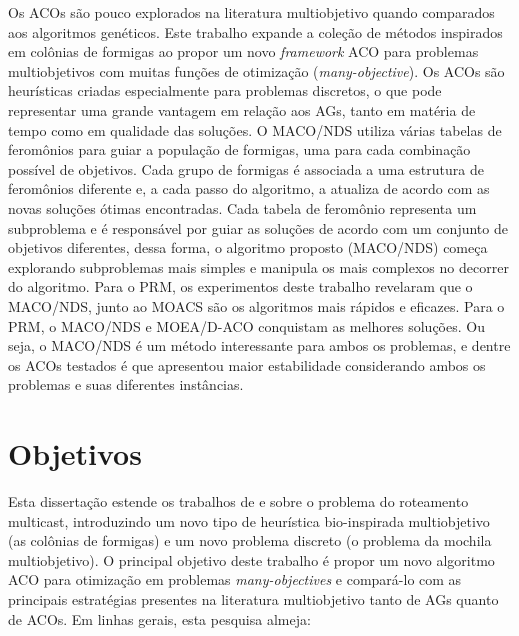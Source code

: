 Os \acp{ACO} são pouco explorados na literatura multiobjetivo quando comparados aos algoritmos genéticos. Este trabalho expande a coleção de métodos inspirados em colônias de formigas ao propor um novo \textit{framework} ACO para problemas multiobjetivos com muitas funções de otimização (\textit{many-objective}). Os ACOs são heurísticas criadas especialmente para problemas discretos, o que pode representar uma grande vantagem em relação aos AGs, tanto em matéria de tempo como em qualidade das soluções. O MACO/NDS utiliza várias tabelas de feromônios para guiar a população de formigas, uma para cada combinação possível de objetivos. Cada grupo de formigas é associada a uma estrutura de feromônios diferente e, a cada passo do algoritmo, a atualiza de acordo com as novas soluções ótimas encontradas. Cada tabela de feromônio representa um subproblema e é responsável por guiar as soluções de acordo com um conjunto de objetivos diferentes, dessa forma, o algoritmo proposto (MACO/NDS) começa explorando subproblemas mais simples e manipula os mais complexos no decorrer do algoritmo. Para o PRM, os experimentos deste trabalho revelaram que o MACO/NDS, junto ao MOACS são os algoritmos mais rápidos e eficazes. Para o PRM, o MACO/NDS e MOEA/D-ACO conquistam as melhores soluções. Ou seja, o MACO/NDS é um método interessante para ambos os problemas, e dentre os ACOs testados é que apresentou maior estabilidade considerando ambos os problemas e suas diferentes instâncias.

\section{Objetivos}
Esta dissertação estende os trabalhos de \cite{Lafeta2016} e \cite{Bueno2010} sobre o problema do roteamento multicast, introduzindo um novo tipo de heurística bio-inspirada multiobjetivo (as colônias de formigas) e um novo problema discreto (o problema da mochila multiobjetivo). O principal objetivo deste trabalho é propor um novo algoritmo ACO para otimização em problemas \textit{many-objectives} e compará-lo com as principais estratégias presentes na literatura multiobjetivo tanto de AGs quanto de ACOs. Em linhas gerais, esta pesquisa almeja:
 
